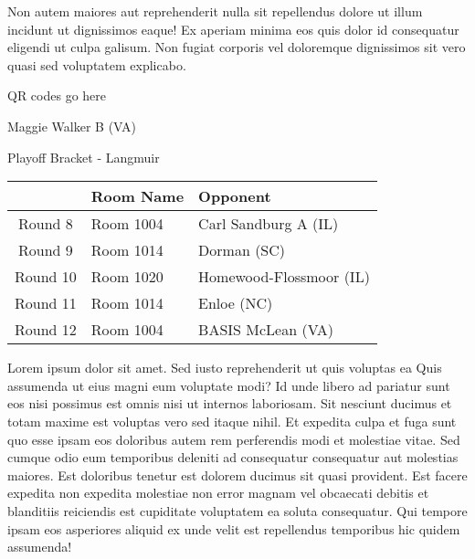 \documentclass{article}%
\begin{document}
\newline%
Non autem maiores aut reprehenderit nulla sit repellendus dolore ut illum incidunt ut dignissimos eaque! Ex aperiam minima eos quis dolor id consequatur eligendi ut culpa galisum. Non fugiat corporis vel doloremque dignissimos sit vero quasi sed voluptatem explicabo.\newline%
\newline%
%
\vspace*{30pt}%
\begin{center}%
\begin{Huge}%
QR codes go here%
\end{Huge}%
\end{center}%
\newpage%
\begin{center}%
\begin{Huge}%
Maggie Walker B (VA)%
\end{Huge}%
\vspace*{8pt}%
\linebreak%
\begin{Large}%
Playoff Bracket {-} Langmuir%
\end{Large}%
\end{center}%
\begin{tabularx}{\textwidth}{|c|Y|Y|}%
\hline%
&Room Name&Opponent\\%
\hline%
Round 8&Room 1004&Carl Sandburg A (IL)\\%
Round 9&Room 1014&Dorman (SC)\\%
Round 10&Room 1020&Homewood{-}Flossmoor (IL)\\%
Round 11&Room 1014&Enloe (NC)\\%
Round 12&Room 1004&BASIS McLean (VA)\\%
\hline%
\end{tabularx}%
\vspace*{8pt}%
\linebreak%
\newline%
\newline%
Lorem ipsum dolor sit amet. Sed iusto reprehenderit ut quis voluptas ea Quis assumenda ut eius magni eum voluptate modi? Id unde libero ad pariatur sunt eos nisi possimus est omnis nisi ut internos laboriosam. Sit nesciunt ducimus et totam maxime est voluptas vero sed itaque nihil. Et expedita culpa et fuga sunt quo esse ipsam eos doloribus autem rem perferendis modi et molestiae vitae.\newline%
\newline%
Sed cumque odio eum temporibus deleniti ad consequatur consequatur aut molestias maiores. Est doloribus tenetur est dolorem ducimus sit quasi provident. Est facere expedita non expedita molestiae non error magnam vel obcaecati debitis et blanditiis reiciendis est cupiditate voluptatem ea soluta consequatur. Qui tempore ipsam eos asperiores aliquid ex unde velit est repellendus temporibus hic quidem assumenda!\newline%
\end{document}
